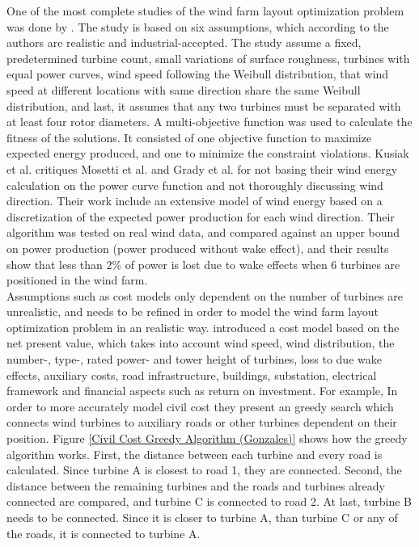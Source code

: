 \noindent One of the most complete studies of the wind farm layout optimization problem was done by \cite{Kusiak}. The study is based on six assumptions, which according to the authors are realistic and industrial-accepted. The study assume a fixed, predetermined turbine count, small variations of surface roughness, turbines with equal power curves, wind speed following the Weibull distribution, that wind speed at different locations with same direction share the same Weibull distribution, and last, it assumes that any two turbines must be separated with at least four rotor diameters. A multi-objective function was used to calculate the fitness of the solutions. It consisted of one objective function to maximize expected energy produced, and one to minimize the constraint violations. Kusiak et al. critiques Mosetti et al. and Grady et al. for not basing their wind energy calculation on the power curve function and not thoroughly discussing wind direction. Their work include an extensive model of wind energy based on a discretization of the expected power production for each wind direction. Their algorithm was tested on real wind data, and compared against an upper bound on power production (power produced without wake effect), and their results show that less than 2\% of power is lost due to wake effects when 6 turbines are positioned in the wind farm. \\


\noindent Assumptions such as cost models only dependent on the number of turbines are unrealistic, and needs to be refined in order to model the wind farm layout optimization problem in an realistic way.  \cite{Gonzalez} introduced a cost model based on the net present value, which takes into account wind speed, wind distribution, the number-, type-, rated power- and tower height of turbines, loss to due wake effects, auxiliary costs, road infrastructure, buildings, substation, electrical framework and financial aspects such as return on investment. For example, In order to more accurately model civil cost they present an greedy search which connects wind turbines to auxiliary roads or other turbines dependent on their position. Figure \ref{Civil Cost Greedy Algorithm (Gonzales)} shows how the greedy algorithm works. First, the distance between each turbine and every road is calculated. Since turbine A is closest to road 1, they are connected. Second, the distance between the remaining turbines and the roads and turbines already connected are compared, and turbine C is connected to road 2. At last, turbine B needs to be connected. Since it is closer to turbine A, than turbine C or any of the roads, it is connected to turbine A.\\



